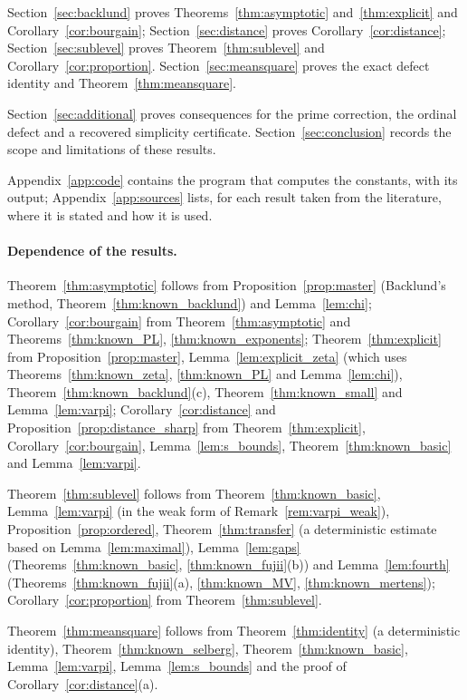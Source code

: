 \documentclass[11pt,a4paper]{article}
\makeatletter
\numberwithin{equation}{section}
\DeclareRobustCommand{\CGref}[1]{\ref{#1}}
\let\CG@origref\ref
\newcommand{\CG@gettip}[1]{\@ifundefined{CGTip@#1}{#1}{\csname CGTip@#1\endcsname}}
\DeclareRobustCommand{\CGref}[1]{\pdftooltip{\CG@origref{#1}}{\CG@gettip{#1}}}
\theoremstyle{definition}
\theoremstyle{remark}
\makeatother
\begin{document}
Section~\CGref{sec:backlund} proves Theorems~\CGref{thm:asymptotic} and~\CGref{thm:explicit} and Corollary~\CGref{cor:bourgain}; Section~\CGref{sec:distance} proves Corollary~\CGref{cor:distance}; Section~\CGref{sec:sublevel} proves Theorem~\CGref{thm:sublevel} and Corollary~\CGref{cor:proportion}. Section~\CGref{sec:meansquare} proves the exact defect identity and Theorem~\CGref{thm:meansquare}.

Section~\CGref{sec:additional} proves consequences for the prime correction, the ordinal defect and a recovered simplicity certificate. Section~\CGref{sec:conclusion} records the scope and limitations of these results.

Appendix~\CGref{app:code} contains the program that computes the constants, with its output; Appendix~\CGref{app:sources} lists, for each result taken from the literature, where it is stated and how it is used.

\paragraph{Dependence of the results.}
Theorem~\CGref{thm:asymptotic} follows from Proposition~\CGref{prop:master} (Backlund's method, Theorem~\CGref{thm:known_backlund}) and Lemma~\CGref{lem:chi}; Corollary~\CGref{cor:bourgain} from Theorem~\CGref{thm:asymptotic} and Theorems~\CGref{thm:known_PL}, \CGref{thm:known_exponents}; Theorem~\CGref{thm:explicit} from Proposition~\CGref{prop:master}, Lemma~\CGref{lem:explicit_zeta} (which uses Theorems~\CGref{thm:known_zeta}, \CGref{thm:known_PL} and Lemma~\CGref{lem:chi}), Theorem~\CGref{thm:known_backlund}(c), Theorem~\CGref{thm:known_small} and Lemma~\CGref{lem:varpi}; Corollary~\CGref{cor:distance} and Proposition~\CGref{prop:distance_sharp} from Theorem~\CGref{thm:explicit}, Corollary~\CGref{cor:bourgain}, Lemma~\CGref{lem:s_bounds}, Theorem~\CGref{thm:known_basic} and Lemma~\CGref{lem:varpi}.

Theorem~\CGref{thm:sublevel} follows from Theorem~\CGref{thm:known_basic}, Lemma~\CGref{lem:varpi} (in the weak form of Remark~\CGref{rem:varpi_weak}), Proposition~\CGref{prop:ordered}, Theorem~\CGref{thm:transfer} (a deterministic estimate based on Lemma~\CGref{lem:maximal}), Lemma~\CGref{lem:gaps} (Theorems~\CGref{thm:known_basic}, \CGref{thm:known_fujii}(b)) and Lemma~\CGref{lem:fourth} (Theorems~\CGref{thm:known_fujii}(a), \CGref{thm:known_MV}, \CGref{thm:known_mertens}); Corollary~\CGref{cor:proportion} from Theorem~\CGref{thm:sublevel}.

Theorem~\CGref{thm:meansquare} follows from Theorem~\CGref{thm:identity} (a deterministic identity), Theorem~\CGref{thm:known_selberg}, Theorem~\CGref{thm:known_basic}, Lemma~\CGref{lem:varpi}, Lemma~\CGref{lem:s_bounds} and the proof of Corollary~\CGref{cor:distance}(a).
\end{document}
